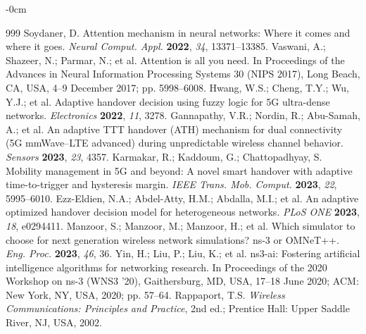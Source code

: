 \begin{adjustwidth}{-\extralength}{0cm}
\begin{thebibliography}{999}
Soydaner, D. Attention mechanism in neural networks: Where it comes and where it goes. {\em Neural Comput. Appl.} {\bf 2022}, {\em 34}, 13371--13385.
Vaswani, A.; Shazeer, N.; Parmar, N.; et al. Attention is all you need. In Proceedings of the Advances in Neural Information Processing Systems 30 (NIPS 2017), Long Beach, CA, USA, 4--9 December 2017; pp. 5998--6008.
Hwang, W.S.; Cheng, T.Y.; Wu, Y.J.; et al. Adaptive handover decision using fuzzy logic for 5G ultra-dense networks. {\em Electronics} {\bf 2022}, {\em 11}, 3278.
Gannapathy, V.R.; Nordin, R.; Abu-Samah, A.; et al. An adaptive TTT handover (ATH) mechanism for dual connectivity (5G mmWave--LTE advanced) during unpredictable wireless channel behavior. {\em Sensors} {\bf 2023}, {\em 23}, 4357.
Karmakar, R.; Kaddoum, G.; Chattopadhyay, S. Mobility management in 5G and beyond: A novel smart handover with adaptive time-to-trigger and hysteresis margin. {\em IEEE Trans. Mob. Comput.} {\bf 2023}, {\em 22}, 5995--6010.
Ezz-Eldien, N.A.; Abdel-Atty, H.M.; Abdalla, M.I.; et al. An adaptive optimized handover decision model for heterogeneous networks. {\em PLoS ONE} {\bf 2023}, {\em 18}, e0294411.
Manzoor, S.; Manzoor, M.; Manzoor, H.; et al. Which simulator to choose for next generation wireless network simulations? ns-3 or OMNeT++. {\em Eng. Proc.} {\bf 2023}, {\em 46}, 36.
Yin, H.; Liu, P.; Liu, K.; et al. ns3-ai: Fostering artificial intelligence algorithms for networking research. In Proceedings of the 2020 Workshop on ns-3 (WNS3 '20), Gaithersburg, MD, USA, 17--18 June 2020; ACM: New York, NY, USA, 2020; pp. 57--64.
Rappaport, T.S. \textit{Wireless Communications: Principles and Practice}, 2nd ed.; Prentice Hall: Upper Saddle River, NJ, USA, 2002.
\end{thebibliography}

\PublishersNote{}
\end{adjustwidth}

